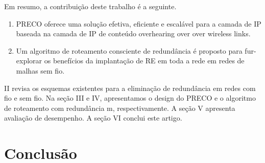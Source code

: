 \documentclass[12pt]{article}
\begin{document}
Em resumo, a contribuição deste trabalho é a seguinte.
\begin{enumerate}
\item PRECO oferece uma solução efetiva, eficiente e escalável
para a camada de IP baseada na camada de IP de conteúdo overhearing over over wireless
links.
\item Um algoritmo de roteamento consciente de redundância é proposto para fur-
explorar os benefícios da implantação de RE em toda a rede em
redes de malhas sem fio.
\end{enumerate}

II revisa os esquemas existentes para a eliminação de redundância em
redes com fio e sem fio. Na seção III e IV, apresentamos 
o design do PRECO e o algoritmo de roteamento com redundância
m, respectivamente. A seção V apresenta avaliação de desempenho.
A seção VI conclui este artigo.




\section{Conclusão}


\end{document}
